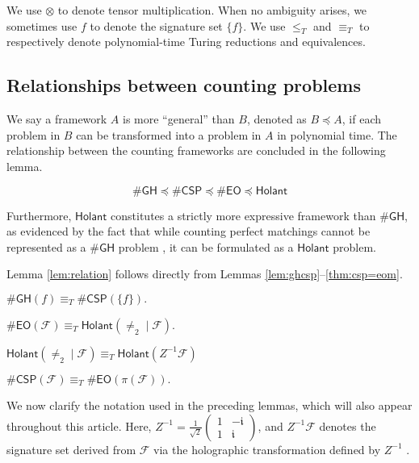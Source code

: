 \documentclass[a4paper,UKenglish,cleveref, autoref, thm-restate]{lipics-v2021}
\newcommand{\hol}[0]{\textsf{Holant}}
\newcommand{\eo}[0]{\textsf{EO}}
\newcommand{\csp}[0]{\textsf{CSP}}
\begin{document}
We use $\otimes$ to denote tensor multiplication. When no ambiguity arises, we sometimes use $f$ to denote the signature set $\{f\}$. We use $\leq_T$ and $\equiv_T$ to respectively denote polynomial-time Turing reductions and equivalences. 
\subsection{Relationships between counting problems}\label{section:relation}


 We say a framework $A$ is more ``general'' than $B$, denoted as $B\preceq A$, if each problem in $B$ can be transformed into a problem in $A$ in polynomial time. The relationship between the counting frameworks are concluded in the following lemma.
\begin{lemma}
    $$\#\textsf{GH}\preceq \#\csp\preceq \#\eo\preceq \hol$$
    \label{lem:relation}
\end{lemma}

Furthermore, $\hol$ constitutes a strictly more expressive framework than $\#\textsf{GH}$, as evidenced by the fact that while counting perfect matchings cannot be represented as a $\#\textsf{GH}$ problem \cite{cai2022perfect}, it can be formulated as a $\hol$ problem.

Lemma \ref{lem:relation} follows directly from Lemmas \ref{lem:ghcsp}--\ref{thm:csp=eom}.
\begin{lemma}
    $\#\textsf{GH}(f)\equiv_T\#\csp(\{f\}).$
    \label{lem:ghcsp}
\end{lemma}

\begin{lemma}
    $\#\eo(\mathcal{F})\equiv_T\hol(\neq_2\mid\mathcal{F})$.
    \label{lem:eo=hol}
\end{lemma}

\begin{lemma}
    $\hol(\neq_2\mid\mathcal{F})\equiv_T \hol(Z^{-1}\mathcal{F})$
\end{lemma}

\begin{lemma}  \label{thm:csp=eom}
    $\#\csp(\mathcal{F})\equiv_T\#\eo(\pi(\mathcal{F})).$
\end{lemma}

We now clarify the notation used in the preceding lemmas, which will also appear throughout this article. Here, $Z^{-1}=\frac{1}{\sqrt{2}}\left(\begin{matrix}
1 & -\mathfrak{i} \\
1 & \mathfrak{i}
\end{matrix}\right)$, and $Z^{-1}\mathcal{F}$ denotes the signature set derived from $\mathcal{F}$ via the holographic transformation defined by $Z^{-1}$ \cite{valiant2008holographic,cai2007valiant}. 
\end{document}
